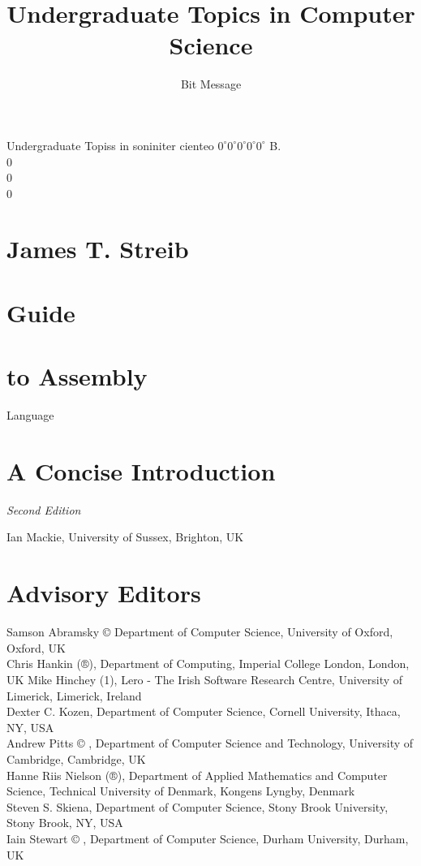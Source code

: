 \documentclass[10pt]{book}
\title{\textbf{Undergraduate Topics in Computer Science}}
\author{Bit Message}
\date{}
\begin{document}
\maketitle
\tableofcontents

Undergraduate Topiss in soniniter cienteo $0^{\circ} 0^{\circ} 0^{\circ} 0^{\circ} 0^{\circ}$ B.\\
0\\
0\\
0

\section*{James T. Streib}
\section*{Guide}
\section*{to Assembly}
 Language\section*{A Concise Introduction}
\textit{Second Edition}

Ian Mackie, University of Sussex, Brighton, UK

\section*{Advisory Editors}
Samson Abramsky © Department of Computer Science, University of Oxford, Oxford, UK\\
Chris Hankin (®), Department of Computing, Imperial College London, London, UK Mike Hinchey (1), Lero - The Irish Software Research Centre, University of Limerick, Limerick, Ireland\\
Dexter C. Kozen, Department of Computer Science, Cornell University, Ithaca, NY, USA\\
Andrew Pitts © , Department of Computer Science and Technology, University of Cambridge, Cambridge, UK\\
Hanne Riis Nielson (®), Department of Applied Mathematics and Computer Science, Technical University of Denmark, Kongens Lyngby, Denmark\\
Steven S. Skiena, Department of Computer Science, Stony Brook University, Stony Brook, NY, USA\\
Iain Stewart © , Department of Computer Science, Durham University, Durham, UK\\
\end{document}
